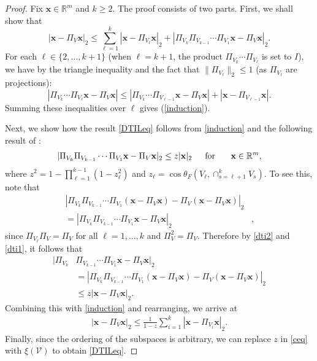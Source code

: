 \documentclass[journal, twocolumn]{IEEEtran}
\begin{document}
\begin{proof} 
Fix $\mathbf{x} \in \mathbb{R}^m$ and $k \geq 2$. The proof consists of two parts. First, we shall show that 
\begin{equation}\label{induction}
|\mathbf{x} - \Pi_V\mathbf{x}|_2 \leq \sum_{\ell=1}^k |\mathbf{x} - \Pi_{V_{\ell}} \mathbf{x}|_2 + |\Pi_{V_{k}}\Pi_{V_{k-1}}\cdots\Pi_{V_{1}} \mathbf{x} - \Pi_V \mathbf{x}|_2.
\end{equation}
For each $\ell \in \{2, \ldots, k+1\}$ (when $\ell = k+1$, the product $\Pi_{V_k} \cdots \Pi_{V_{\ell}}$ is set to $I$), we have by the triangle inequality and the fact that $\|\Pi_{V_{\ell}}\|_2 \leq 1$ (as $\Pi_{V_{\ell}}$ are projections):
\begin{equation}
|\Pi_{V_k} \cdots \Pi_{V_{\ell}}\mathbf{x} - \Pi_V \mathbf{x}|  \leq  |\Pi_{V_k} \cdots \Pi_{V_{\ell-1}}\mathbf{x} - \Pi_V \mathbf{x}| + 
|\mathbf{x} - \Pi_{V_{\ell-1}}\mathbf{x}|.
\end{equation}
Summing these inequalities over $\ell$ gives (\ref{induction}).

Next, we show how the result \eqref{DTILeq} follows from \eqref{induction} and the following result of \cite[Theorem 9.33]{Deutsch12}:
\begin{align}\label{dti2}
|\Pi_{V_k}\Pi_{V_{k-1}}\cdots\Pi_{V_1} \mathbf{x} - \Pi_V\mathbf{x}|_2 \leq z |\mathbf{x}|_2 \indent \text{for } \indent \mathbf{x} \in \mathbb{R}^m,
\end{align}
where $z^2= 1 - \prod_{\ell =1}^{k-1}(1-z_{\ell}^2)$ and $z_{\ell} = \cos\theta_F\left(V_{\ell}, \cap_{s=\ell+1}^k V_s\right)$. To see this, note that
\begin{align}\label{dti1}
|\Pi_{V_k}\Pi_{V_{k-1}}\cdots\Pi_{V_1}(\mathbf{x} - \Pi_V\mathbf{x}) - \Pi_V(\mathbf{x} - \Pi_V\mathbf{x})|_2& \\
= |\Pi_{V_k}\Pi_{V_{k-1}}\cdots\Pi_{V_1} \mathbf{x} - \Pi_V \mathbf{x} |_2&,
\end{align}
since $\Pi_{V_\ell} \Pi_V = \Pi_V$ for all $\ell = 1, \ldots, k$ and $\Pi_V^2 = \Pi_V$.
Therefore by \eqref{dti2} and \eqref{dti1}, it follows that
\begin{align*}
|\Pi_{V_k}&\Pi_{V_{k-1}}\cdots\Pi_{V_1} \mathbf{x} - \Pi_V \mathbf{x} |_2 \\
&= |\Pi_{V_k}\Pi_{V_{k-1}}\cdots\Pi_{V_1}(\mathbf{x} - \Pi_V\mathbf{x}) - \Pi_V(\mathbf{x} - \Pi_V\mathbf{x})|_2 \\
&\leq z |\mathbf{x} - \Pi_V\mathbf{x}|_2.
\end{align*}
Combining this with \eqref{induction} and rearranging, we arrive at
\begin{align}\label{ceq}
|\mathbf{x} - \Pi_V \mathbf{x}|_2 \leq \frac{1}{1 - z} \sum_{i=1}^k |\mathbf{x} - \Pi_{V_i} \mathbf{x}|_2.
\end{align}
Finally, since the ordering of the subspaces is arbitrary, we can replace $z$ in \eqref{ceq} with $\xi(\mathcal{V})$ to obtain \eqref{DTILeq}.
\end{proof}
\end{document}
